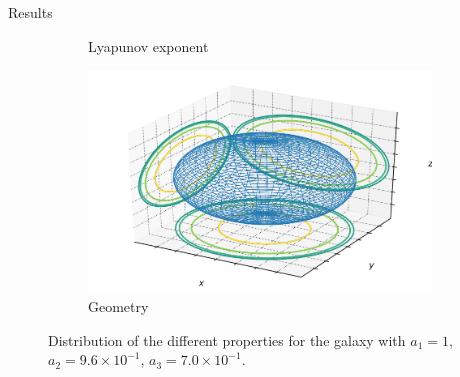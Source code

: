 \documentclass{beamer}
\begin{document}
\begin{frame}{Results}
\begin{figure}[h]
\begin{subfigure}[t]{0.35\textwidth}
			\caption{Lyapunov exponent}
		\end{subfigure}
		\begin{subfigure}[t]{0.35\textwidth}
			\includegraphics[width=\textwidth]{"../Files/Week 13/images/10_ellipsoid"}
			\caption{Geometry}
		\end{subfigure}
		\caption{Distribution of the different properties for the galaxy with $a_1 = 1$, $a_2 = 9.6\times10^{-1}$, $a_3 = 7.0\times10^{-1}$.}
	\end{figure}
\end{frame}
\end{document}
